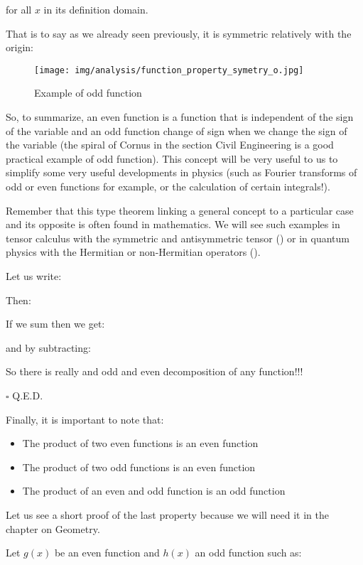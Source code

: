 \begin{enumerate}
		for all $x$ in its definition domain.
		
		That is to say as we already seen previously, it is symmetric relatively with the origin:
		\begin{figure}[H]
			\centering	\texttt{[image: img/analysis/function\_property\_symetry\_o.jpg]}
			\caption{Example of odd function}
		\end{figure}
		So, to summarize, an even function is a function that is independent of the sign of the variable and an odd function change of sign when we change the sign of the variable (the spiral of Cornus in the section Civil Engineering is a good practical example of odd function). This concept will be very useful to us to simplify some very useful developments in physics (such as Fourier transforms of odd or even functions for example, or the calculation of certain integrals!).
		\begin{theorem}
		Remember that this type theorem linking a general concept to a particular case and its opposite is often found in mathematics. We will see such examples in tensor calculus with the symmetric and antisymmetric tensor () or in quantum physics with the Hermitian or non-Hermitian operators ().
		\end{theorem}
		\begin{dem}
		Let us write:
		
		Then:
		
		If we sum then we get:
		
		and by subtracting:
		
		So there is really and odd and even decomposition of any function!!!
		\begin{flushright}
			$\square$  Q.E.D.
		\end{flushright}
		\end{dem}
		Finally, it is important to note that:
		\begin{itemize}
			\item The product of two even functions is an even function
			\item The product of two odd functions is an even function
			\item The product of an even and odd function is an odd function
		\end{itemize}
		Let us see a short proof of the last property because we will need it in the chapter on Geometry.
		\begin{dem}
		Let $g(x)$ be an even function and $h(x)$ an odd function such as:
		

\end{dem}
\end{enumerate}
